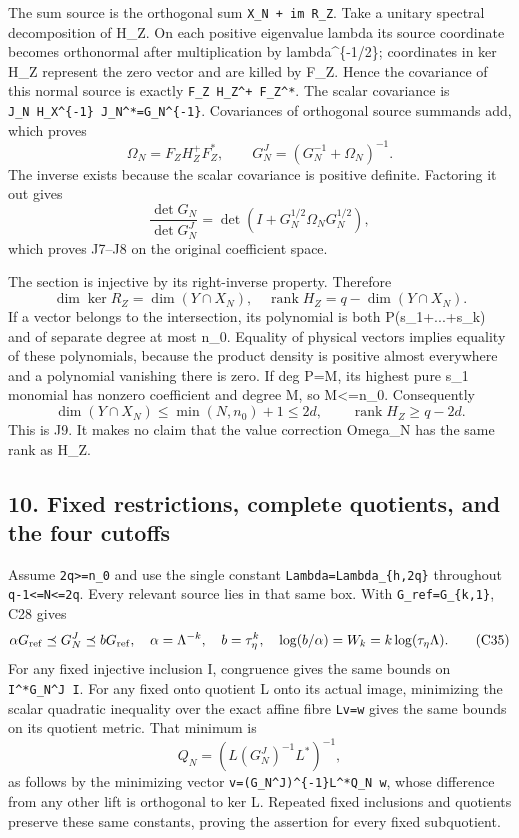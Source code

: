 \documentclass[11pt]{article}
\begin{document}
The sum source is the orthogonal sum \texttt{X\_N\ +\ im\ R\_Z}. Take a unitary spectral decomposition of H\_Z. On each positive eigenvalue lambda its source coordinate becomes orthonormal after multiplication by lambda\^{}\{-1/2\}; coordinates in ker H\_Z represent the zero vector and are killed by F\_Z. Hence the covariance of this normal source is exactly \texttt{F\_Z\ H\_Z\^{}+\ F\_Z\^{}*}. The scalar covariance is \texttt{J\_N\ H\_X\^{}\{-1\}\ J\_N\^{}*=G\_N\^{}\{-1\}}. Covariances of orthogonal source summands add, which proves \[
\Omega_N=F_ZH_Z^+F_Z^*,\qquad
G_N^J=(G_N^{-1}+\Omega_N)^{-1}.
\tag{C32}
\] The inverse exists because the scalar covariance is positive definite. Factoring it out gives \[
\frac{\det G_N}{\det G_N^J}
=\det(I+G_N^{1/2}\Omega_NG_N^{1/2}),
\tag{C33}
\] which proves J7--J8 on the original coefficient space.

The section is injective by its right-inverse property. Therefore \[
\dim\ker R_Z=\dim(Y\cap X_N),\quad
\operatorname{rank}H_Z=q-\dim(Y\cap X_N).
\] If a vector belongs to the intersection, its polynomial is both P(s\_1+...+s\_k) and of separate degree at most n\_0. Equality of physical vectors implies equality of these polynomials, because the product density is positive almost everywhere and a polynomial vanishing there is zero. If deg P=M, its highest pure s\_1 monomial has nonzero coefficient and degree M, so M\textless=n\_0. Consequently \[
\dim(Y\cap X_N)\le\min(N,n_0)+1\le2d,
\qquad \operatorname{rank}H_Z\ge q-2d.
\tag{C34}
\] This is J9. It makes no claim that the value correction Omega\_N has the same rank as H\_Z.

\subsection{10. Fixed restrictions, complete quotients, and the four cutoffs}\label{mrcoerc:fixed-restrictions-complete-quotients-and-the-four-cutoffs}

Assume \texttt{2q\textgreater{}=n\_0} and use the single constant \texttt{Lambda=Lambda\_\{h,2q\}} throughout \texttt{q-1\textless{}=N\textless{}=2q}. Every relevant source lies in that same box. With \texttt{G\_ref=G\_\{k,1\}}, C28 gives \[
\alpha G_{\rm ref}\preceq G_N^J\preceq bG_{\rm ref},
\quad \alpha=\Lambda^{-k},\quad b=\tau_\eta^k,
\quad \log(b/\alpha)=W_k=k\log(\tau_\eta\Lambda).
\tag{C35}
\] For any fixed injective inclusion I, congruence gives the same bounds on \texttt{I\^{}*G\_N\^{}J\ I}. For any fixed onto quotient L onto its actual image, minimizing the scalar quadratic inequality over the exact affine fibre \texttt{Lv=w} gives the same bounds on its quotient metric. That minimum is \[
Q_N=(L(G_N^J)^{-1}L^*)^{-1},
\] as follows by the minimizing vector \texttt{v=(G\_N\^{}J)\^{}\{-1\}L\^{}*Q\_N\ w}, whose difference from any other lift is orthogonal to ker L. Repeated fixed inclusions and quotients preserve these same constants, proving the assertion for every fixed subquotient.
\end{document}
